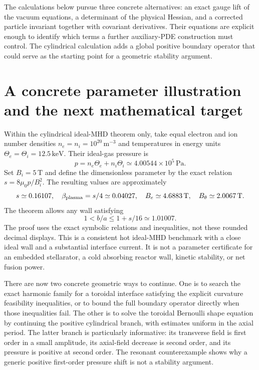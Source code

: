 \documentclass[11pt]{article}
\begin{document}
The calculations below pursue three concrete alternatives: an exact gauge lift of the vacuum equations, a determinant of the physical Hessian, and a corrected particle invariant together with covariant derivatives. Their equations are explicit enough to identify which terms a further auxiliary-PDE construction must control. The cylindrical calculation adds a global positive boundary operator that could serve as the starting point for a geometric stability argument.






\section{A concrete parameter illustration and the next mathematical target}

Within the cylindrical ideal-MHD theorem only, take equal electron and ion number densities $n_e=n_i=10^{20}\,\mathrm{m}^{-3}$ and temperatures in energy units $\Theta_e=\Theta_i=12.5\,\mathrm{keV}$. Their ideal-gas pressure is
\[
p=n_e\Theta_e+n_i\Theta_i\simeq4.00544\times10^5\,\mathrm{Pa}.
\]
Set $B_i=5\,\mathrm T$ and define the dimensionless parameter by the exact relation $s=8\mu_0p/B_i^2$. The resulting values are approximately
\[
s\simeq0.16107,\quad \beta_{\rm plasma}=s/4\simeq0.04027,
\quad B_e\simeq4.6883\,\mathrm T,\quad B_\theta\simeq2.0067\,\mathrm T.
\]
The theorem allows any wall satisfying
\[
1<b/a\le1+s/16\simeq1.01007.
\]
The proof uses the exact symbolic relations and inequalities, not these rounded decimal displays. This is a consistent hot ideal-MHD benchmark with a close ideal wall and a substantial interface current. It is not a parameter certificate for an embedded stellarator, a cold absorbing reactor wall, kinetic stability, or net fusion power.

There are now two concrete geometric ways to continue. One is to search the exact harmonic family for a toroidal interface satisfying the explicit curvature feasibility inequalities, or to bound the full boundary operator directly when those inequalities fail. The other is to solve the toroidal Bernoulli shape equation by continuing the positive cylindrical branch, with estimates uniform in the axial period. The latter branch is particularly informative: its transverse field is first order in a small amplitude, its axial-field decrease is second order, and its pressure is positive at second order. The resonant counterexample shows why a generic positive first-order pressure shift is not a stability argument.
\end{document}
